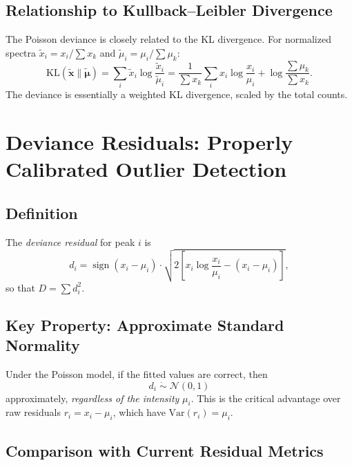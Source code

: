 \documentclass[11pt,a4paper]{article}
\newcommand{\Var}{\mathrm{Var}}
\newcommand{\KL}{\mathrm{KL}}
\DeclareMathOperator{\sign}{sign}
\begin{document}
\subsection{Relationship to Kullback--Leibler Divergence}

The Poisson deviance is closely related to the KL divergence. For normalized spectra
$\tilde{x}_i = x_i / \sum x_k$ and $\tilde{\mu}_i = \mu_i / \sum \mu_k$:
\begin{equation}
    \KL(\tilde{\mathbf{x}} \| \tilde{\boldsymbol{\mu}})
    = \sum_i \tilde{x}_i \log \frac{\tilde{x}_i}{\tilde{\mu}_i}
    = \frac{1}{\sum x_k} \sum_i x_i \log\frac{x_i}{\mu_i}
      + \log\frac{\sum \mu_k}{\sum x_k}.
\end{equation}
The deviance is essentially a weighted KL divergence, scaled by the total counts.

\section{Deviance Residuals: Properly Calibrated Outlier Detection}
\label{sec:deviance-residuals}

\subsection{Definition}

The \emph{deviance residual} for peak $i$ is
\begin{equation}
    d_i = \sign(x_i - \mu_i) \cdot
    \sqrt{2\left[x_i \log\frac{x_i}{\mu_i} - (x_i - \mu_i)\right]},
    \label{eq:dev-resid}
\end{equation}
so that $D = \sum d_i^2$.

\subsection{Key Property: Approximate Standard Normality}

Under the Poisson model, if the fitted values are correct, then
\begin{equation}
    d_i \;\dot\sim\; \mathcal{N}(0, 1)
\end{equation}
approximately, \emph{regardless of the intensity} $\mu_i$. This is the critical advantage
over raw residuals $r_i = x_i - \mu_i$, which have $\Var(r_i) = \mu_i$.

\subsection{Comparison with Current Residual Metrics}
\end{document}
